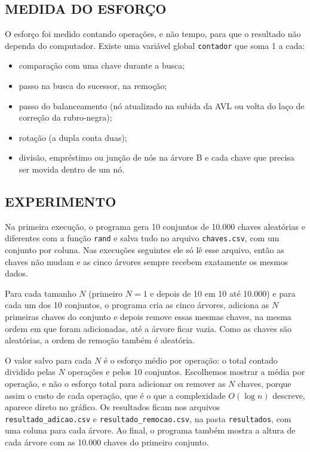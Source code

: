 \subsection{MEDIDA DO ESFORÇO}

O esforço foi medido contando operações, e não tempo, para que o resultado não dependa do computador. Existe uma variável global \texttt{contador} que soma 1 a cada:

\begin{itemize}
\item comparação com uma chave durante a busca;
\item passo na busca do sucessor, na remoção;
\item passo do balanceamento (nó atualizado na subida da AVL ou volta do laço de correção da rubro-negra);
\item rotação (a dupla conta duas);
\item divisão, empréstimo ou junção de nós na árvore B e cada chave que precisa ser movida dentro de um nó.
\end{itemize}

\subsection{EXPERIMENTO}

Na primeira execução, o programa gera 10 conjuntos de 10.000 chaves aleatórias e diferentes com a função \texttt{rand} e salva tudo no arquivo \texttt{chaves.csv}, com um conjunto por coluna. Nas execuções seguintes ele só lê esse arquivo, então as chaves não mudam e as cinco árvores sempre recebem exatamente os mesmos dados.

Para cada tamanho $N$ (primeiro $N = 1$ e depois de 10 em 10 até 10.000) e para cada um dos 10 conjuntos, o programa cria as cinco árvores, adiciona as $N$ primeiras chaves do conjunto e depois remove essas mesmas chaves, na mesma ordem em que foram adicionadas, até a árvore ficar vazia. Como as chaves são aleatórias, a ordem de remoção também é aleatória.

O valor salvo para cada $N$ é o esforço médio por operação: o total contado dividido pelas $N$ operações e pelos 10 conjuntos. Escolhemos mostrar a média por operação, e não o esforço total para adicionar ou remover as $N$ chaves, porque assim o custo de cada operação, que é o que a complexidade $O(\log n)$ descreve, aparece direto no gráfico. Os resultados ficam nos arquivos \texttt{resultado\_adicao.csv} e \texttt{resultado\_remocao.csv}, na pasta \texttt{resultados}, com uma coluna para cada árvore. Ao final, o programa também mostra a altura de cada árvore com as 10.000 chaves do primeiro conjunto.

